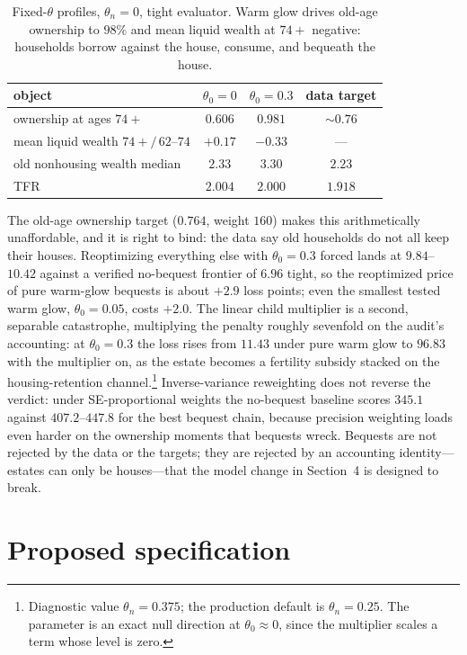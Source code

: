 \documentclass[10pt]{article}
\begin{document}
\begin{table}[h]
\centering
\small
\begin{tabular}{lccc}
\toprule
object & $\theta_0=0$ & $\theta_0=0.3$ & data target \\
\midrule
ownership at ages $74+$ & $0.606$ & $0.981$ & $\sim\!0.76$ \\
mean liquid wealth $74\!+\!/\,62\text{--}74$ & $+0.17$ & $-0.33$ & --- \\
old nonhousing wealth median & $2.33$ & $3.30$ & $2.23$ \\
TFR & $2.004$ & $2.000$ & $1.918$ \\
\bottomrule
\end{tabular}
\caption{Fixed-$\theta$ profiles, $\theta_n=0$, tight evaluator. Warm glow
drives old-age ownership to $98\%$ and mean liquid wealth at $74+$ negative:
households borrow against the house, consume, and bequeath the house.}
\label{tab:mech}
\end{table}

The old-age ownership target ($0.764$, weight $160$) makes this arithmetically
unaffordable, and it is right to bind: the data say old households do not all
keep their houses. Reoptimizing everything else with $\theta_0=0.3$ forced
lands at $9.84$--$10.42$ against a verified no-bequest frontier of $6.96$ tight,
so the reoptimized price of pure warm-glow bequests is about $+2.9$ loss
points; even the smallest tested warm glow, $\theta_0=0.05$, costs $+2.0$. The
linear child multiplier is a second, separable catastrophe, multiplying the
penalty roughly sevenfold on the audit's accounting: at $\theta_0=0.3$ the
loss rises from $11.43$ under pure warm glow to $96.83$ with the multiplier
on, as the estate becomes a fertility subsidy stacked on the housing-retention
channel.\footnote{Diagnostic value $\theta_n=0.375$; the production default is
$\theta_n=0.25$. The parameter is an exact null direction at $\theta_0\approx0$,
since the multiplier scales a term whose level is zero.} Inverse-variance
reweighting does not reverse the verdict: under SE-proportional weights the
no-bequest baseline scores $345.1$ against $407.2$--$447.8$ for the best
bequest chain, because precision weighting loads even harder on the ownership
moments that bequests wreck. Bequests are not rejected by the data or the
targets; they are rejected by an accounting identity---estates can only be
houses---that the model change in Section~4 is designed to break.

\section{Proposed specification}
\end{document}
